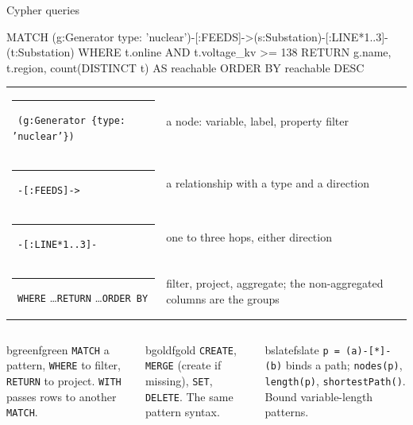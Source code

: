 \documentclass[aspectratio=169, 10pt]{beamer}
\begin{document}
\begin{frame}[fragile]{Cypher queries}
  \vspace{0.1cm}
  \begin{code}
MATCH (g:Generator {type: 'nuclear'})-[:FEEDS]->(s:Substation)-[:LINE*1..3]-(t:Substation)
WHERE t.online AND t.voltage_kv >= 138
RETURN g.name, t.region, count(DISTINCT t) AS reachable
ORDER BY reachable DESC
  \end{code}
  \vspace{-0.1cm}
  {\small
  \begin{tabular}{@{}lp{7.2cm}@{}}
    \textcolor{bgreen}{\rule{6pt}{6pt}}\ \texttt{(g:Generator \{type: 'nuclear'\})} & a node: variable, label, property filter\\
    \textcolor{bgold}{\rule{6pt}{6pt}}\ \texttt{-[:FEEDS]->} & a relationship with a type and a direction\\
    \textcolor{bburg}{\rule{6pt}{6pt}}\ \texttt{-[:LINE*1..3]-} & one to three hops, either direction\\
    \textcolor{bslate}{\rule{6pt}{6pt}}\ \texttt{WHERE} \ldots \texttt{RETURN} \ldots \texttt{ORDER BY} & filter, project, aggregate; the non-aggregated columns are the groups\\
  \end{tabular}}
  \vspace{0.2cm}
  \begin{columns}[T]
      \begin{tbox}[Reading]{bgreen}{fgreen}
        \texttt{MATCH} a pattern, \texttt{WHERE} to filter, \texttt{RETURN} to project. \texttt{WITH} passes rows to another \texttt{MATCH}.
      \end{tbox}
      \begin{tbox}[Writing]{bgold}{fgold}
        \texttt{CREATE}, \texttt{MERGE} (create if missing), \texttt{SET}, \texttt{DELETE}. The same pattern syntax.
      \end{tbox}
      \begin{tbox}[Paths]{bslate}{fslate}
        \texttt{p = (a)-[*]-(b)} binds a path; \texttt{nodes(p)}, \texttt{length(p)}, \texttt{shortestPath()}. Bound variable-length patterns.
      \end{tbox}
  \end{columns}
\end{frame}
\end{document}
